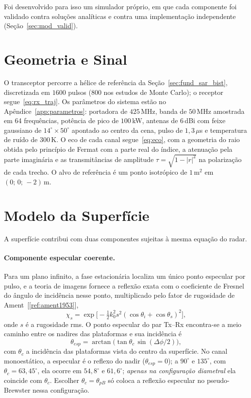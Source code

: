 \documentclass[12pt,a4paper,oneside]{book}
\theoremstyle{remark}
\newcommand{\citar}[1]{[\ref{ref:#1}]}
\theoremstyle{plain}
\theoremstyle{definition}
\begin{document}
Foi desenvolvido para isso um simulador próprio, em que cada componente foi
validado contra soluções analíticas e contra uma implementação independente
(Seção~\ref{sec:mod_valid}).

\section{Geometria e Sinal}
\label{sec:mod_geom}

O transceptor percorre a hélice de referência da Seção~\ref{sec:fund_sar_bist},
discretizada em $1600$ pulsos (800 nos estudos de Monte Carlo); o receptor
segue~\eqref{eq:rx_traj}. Os parâmetros do sistema estão no
Apêndice~\ref{app:parametros}: portadora de $425\,$MHz, banda de $50\,$MHz
amostrada em 64 frequências, potência de pico de $100\,$kW, antenas de $6\,$dBi
com feixe gaussiano de $14^\circ\times50^\circ$ apontado ao centro da cena,
pulso de $1,3\,\mu$s e temperatura de ruído de $300\,$K. O eco de cada canal
segue~\eqref{eq:eco}, com a geometria do raio obtida pelo princípio de Fermat
com a parte real do índice, a atenuação pela parte imaginária e as
transmitâncias de amplitude $\tau=\sqrt{1-|r|^2}$ na polarização de cada trecho.
O alvo de referência é um ponto isotrópico de $1\,$m$^2$ em $(0;\,0;\,-2)\,$m.

\section{Modelo da Superfície}
\label{sec:mod_superficie}

A superfície contribui com duas componentes sujeitas à mesma equação do radar.

\paragraph{Componente especular coerente.} Para um plano infinito, a fase
estacionária localiza um único ponto especular por pulso, e a teoria de
imagens fornece a reflexão exata com o coeficiente de Fresnel do ângulo de
incidência nesse ponto, multiplicado pelo fator de rugosidade de
Ament~\citar{ament1953},
\begin{equation}
  \chi_s=\exp\!\Big[-\tfrac12k_0^2s^2(\cos\theta_i+\cos\theta_s)^2\Big],
\end{equation}
onde $s$ é a rugosidade rms. O ponto especular do par Tx--Rx encontra-se a meio
caminho entre os nadires das plataformas e sua incidência é
\begin{equation}
  \theta_{esp}=\arctan\!\big(\tan\theta_c\,\sin(\Delta\phi/2)\big),
  \label{eq:theta_esp}
\end{equation}
com $\theta_c$ a incidência das plataformas vista do centro da superfície. No
canal monoestático, a especular é o reflexo do nadir ($\theta_{esp}=0$); a
$90^\circ$ e $135^\circ$, com $\theta_c=63,45^\circ$, ela ocorre em $54,8^\circ$ e
$61,6^\circ$; \emph{apenas na configuração diametral} ela coincide com
$\theta_c$. Escolher $\theta_c=\theta_{pB}$ só coloca a reflexão especular no
pseudo-Brewster nessa configuração.
\end{document}
